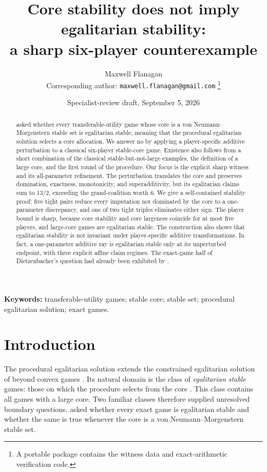 \documentclass[11pt]{article}
\title{Core stability does not imply egalitarian stability:\\
a sharp six-player counterexample}
\author{Maxwell Flanagan\\[2pt]
\normalsize Corresponding author: \texttt{maxwell.flanagan@gmail.com}%
\thanks{A portable package contains the witness data and exact-arithmetic verification code.}}
\date{Specialist-review draft, September 5, 2026}
\begin{document}
\maketitle

\begin{abstract}
\citet{Dietzenbacher2021} asked whether every transferable-utility game whose
core is a von Neumann--Morgenstern stable set is egalitarian stable, meaning
that the procedural egalitarian solution selects a core allocation. We answer
no by applying a player-specific additive perturbation to a classical
six-player stable-core game. Existence also follows from a short combination
of the classical stable-but-not-large examples, the definition of a large
core, and the first round of the procedure. Our focus is the explicit sharp
witness and its all-parameter refinement. The perturbation translates the core and
preserves domination, exactness, monotonicity, and superadditivity, but its
egalitarian claims sum to $13/2$, exceeding the grand-coalition worth $6$.
We give a self-contained stability proof: five tight pairs reduce every
imputation not dominated by the core to a one-parameter discrepancy, and one
of two tight triples eliminates either sign. The player bound is sharp,
because core stability and core largeness coincide for at most five players,
and large-core games are egalitarian stable. The construction also shows that
egalitarian stability is not invariant under player-specific additive
transformations. In fact, a one-parameter additive ray is egalitarian stable
only at its unperturbed endpoint, with three explicit affine claim regimes.
The exact-game half of Dietzenbacher's question had already
been exhibited by \citet{Mauri2017}.
\end{abstract}

\medskip
\noindent\textbf{Keywords:} transferable-utility games; stable core; stable
set; procedural egalitarian solution; exact games.

\section{Introduction}\label{sec:intro}

The procedural egalitarian solution extends the constrained egalitarian
solution of \citet{DuttaRay89} beyond convex games \citep{DBH2017}. Its
natural domain is the class of
\emph{egalitarian stable} games: those on which the procedure selects from the
core \citep{Dietzenbacher2021}. This class contains all games with a large core.
Two familiar classes therefore supplied unresolved boundary questions.
\citet{Dietzenbacher2021} asked whether every exact game is egalitarian stable
and whether the same is true whenever the core is a von
Neumann--Morgenstern stable set.
\end{document}

